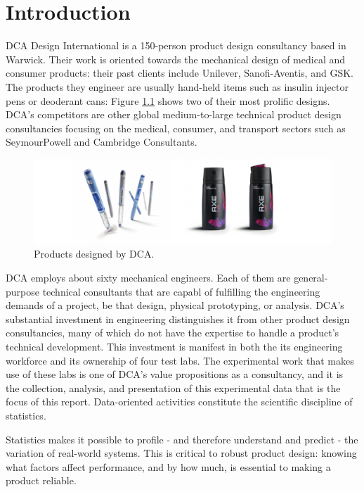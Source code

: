 \documentclass[11pt,a4paper,article]{memoir} %
\begin{document}
\chapter{Introduction}
DCA Design International is a 150-person product design consultancy based in Warwick. Their work is oriented towards the mechanical design of medical and consumer products: their past clients include Unilever, Sanofi-Aventis, and GSK. The products they engineer are usually hand-held items such as insulin injector pens or deoderant cans: Figure \ref{fig:dca_profile} shows two of their most prolific designs. DCA's competitors are other global medium-to-large technical product design consultancies focusing on the medical, consumer, and transport sectors such as SeymourPowell and Cambridge Consultants.
\par
\begin{figure}[b]
\includegraphics[width=\textwidth]{DCA_profile.pdf}
\caption{Products designed by DCA.}
\label{fig:dca_profile}
\end{figure}
\par
DCA employs about sixty mechanical engineers. Each of them are general-purpose technical consultants that are capabl of fulfilling the engineering demands of a project, be that design, physical prototyping, or analysis. DCA's substantial investment in engineering distinguishes it from other product design consultancies, many of which do not have the expertise to handle a product's technical development. This investment is manifest in both the its engineering workforce and its ownership of four test labs. The experimental work that makes use of these labs is one of DCA's value propositions as a consultancy, and it is the collection, analysis, and presentation of this experimental data that is the focus of this report. Data-oriented activities constitute the scientific discipline of statistics.
\par
Statistics makes it possible to profile - and therefore understand and predict - the variation of real-world systems. This is critical to robust product design: knowing what factors affect performance, and by how much, is essential to making a product reliable.
\end{document}
